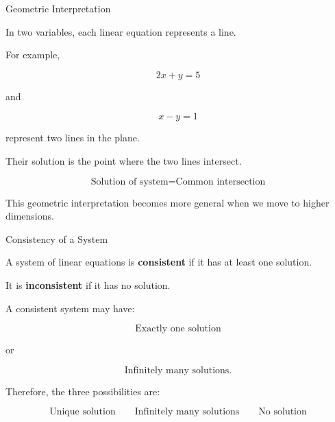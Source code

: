 
\begin{frame}{Geometric Interpretation}

In two variables, each linear equation represents a line.

For example,

\[
2x+y=5
\]

and

\[
x-y=1
\]

represent two lines in the plane.

\vspace{0.4cm}

Their solution is the point where the two lines intersect.

\[
\boxed{
\text{Solution of system}
=
\text{Common intersection}
}
\]

This geometric interpretation becomes more general when
we move to higher dimensions.

\end{frame}



\begin{frame}{Consistency of a System}

A system of linear equations is \textbf{consistent} if it has
at least one solution.

It is \textbf{inconsistent} if it has no solution.

\vspace{0.5cm}

A consistent system may have:

\[
\boxed{
\text{Exactly one solution}
}
\]

or

\[
\boxed{
\text{Infinitely many solutions}.
}
\]

\vspace{0.4cm}

Therefore, the three possibilities are:

\[
\boxed{
\text{Unique solution}
\qquad
\text{Infinitely many solutions}
\qquad
\text{No solution}
}
\]

\end{frame}



